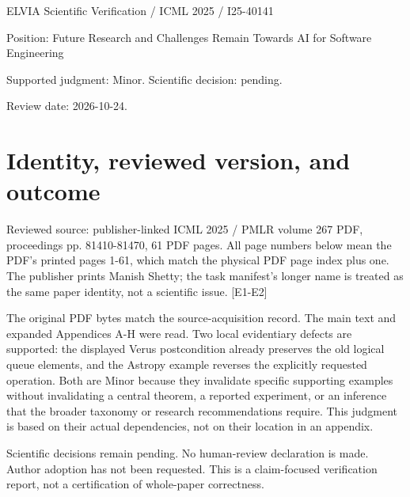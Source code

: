 \documentclass[10pt]{article}
\begin{document}
ELVIA Scientific Verification / ICML 2025 / I25-40141\par
Position: Future Research and Challenges Remain Towards AI for Software Engineering\par
Supported judgment: Minor. Scientific decision: pending.\par
Review date: 2026-10-24.\par
\section*{Identity, reviewed version, and outcome}
Reviewed source: publisher-linked ICML 2025 / PMLR volume 267 PDF, proceedings pp. 81410-81470, 61 PDF pages. All page numbers below mean the PDF’s printed pages 1-61, which match the physical PDF page index plus one. The publisher prints Manish Shetty; the task manifest’s longer name is treated as the same paper identity, not a scientific issue. [E1-E2]\par
The original PDF bytes match the source-acquisition record. The main text and expanded Appendices A-H were read. Two local evidentiary defects are supported: the displayed Verus postcondition already preserves the old logical queue elements, and the Astropy example reverses the explicitly requested operation. Both are Minor because they invalidate specific supporting examples without invalidating a central theorem, a reported experiment, or an inference that the broader taxonomy or research recommendations require. This judgment is based on their actual dependencies, not on their location in an appendix.\par
Scientific decisions remain pending. No human-review declaration is made. Author adoption has not been requested. This is a claim-focused verification report, not a certification of whole-paper correctness.\par
\end{document}
